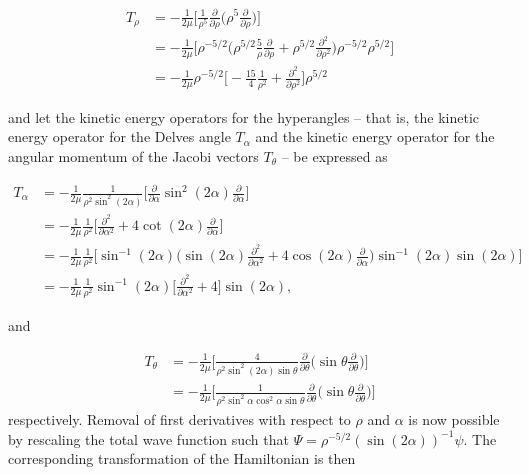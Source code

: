 \begin{equation}\label{eq:kinetic_rho}
\begin{aligned}
T_{\rho} &= -\frac{1}{2\mu} \Big[ \frac{1}{\rho^5}\frac{\partial}{\partial\rho} \Big( \rho^5 \frac{\partial}{\partial\rho} \Big)  \Big] \\ 
&= -\frac{1}{2\mu} \Big[ \rho^{-5/2} \Big( \rho^{5/2} \frac{5}{\rho} \frac{\partial}{\partial\rho} + \rho^{5/2} \frac{\partial^2}{\partial\rho^2} \Big) \rho^{-5/2} \rho^{5/2} \Big]\\
&= -\frac{1}{2\mu} \rho^{-5/2} \Big[  -\frac{15}{4} \frac{1}{\rho^2} + \frac{\partial^2}{\partial\rho^2} \Big] \rho^{5/2}
\end{aligned}
\end{equation}

and let the kinetic energy operators for the hyperangles -- that is, the kinetic energy operator for the Delves angle $T_{\alpha}$ and the kinetic energy operator for the angular momentum of the Jacobi vectors $T_{\theta}$ -- be expressed as 

\begin{equation}\label{eq:kinetic_alpha}
\begin{aligned}
T_{\alpha} &= -\frac{1}{2\mu}  \frac{1}{\rho^2 \sin^2(2\alpha)}  \bigg[ \frac{\partial}{\partial\alpha} \sin^2(2\alpha) \frac{\partial}{\partial\alpha} \bigg]\\ 
&= -\frac{1}{2\mu} \frac{1}{\rho^2} \bigg[ \frac{\partial^2}{\partial\alpha^2} + 4\cot(2\alpha) \frac{\partial}{\partial\alpha} \bigg]\\
&= -\frac{1}{2\mu} \frac{1}{\rho^2} \bigg[ \sin^{-1}(2\alpha) \bigg(\sin(2\alpha)\frac{\partial^2}{\partial\alpha^2} + 4\cos(2\alpha) \frac{\partial}{\partial\alpha} \bigg) \sin^{-1}(2\alpha) \sin(2\alpha) \bigg]\\
&= -\frac{1}{2\mu} \frac{1}{\rho^2}\sin^{-1}(2\alpha) \bigg[ \frac{\partial^2}{\partial\alpha^2} + 4 \bigg] \sin(2\alpha),
\end{aligned} 
\end{equation}

and

\begin{align}                  
T_{\theta} &= -\frac{1}{2\mu} \bigg[ \frac{4}{\rho^2 \sin^2(2\alpha)\sin\theta} \frac{\partial}{\partial\theta} \bigg( \sin\theta \frac{\partial}{\partial\theta} \bigg) \bigg]\nonumber\\ 
&= -\frac{1}{2\mu} \bigg[ \frac{1}{\rho^2 \sin^2\alpha\cos^2\alpha\sin\theta} \frac{\partial}{\partial\theta} \bigg( \sin\theta \frac{\partial}{\partial\theta} \bigg) \bigg]
\end{align}
respectively. Removal of first derivatives with respect to $\rho$ and $\alpha$ is now possible by rescaling the total wave function such that $\Psi = \rho^{-5/2}(\sin(2\alpha))^{-1}\psi$. The corresponding transformation of the Hamiltonian is then

